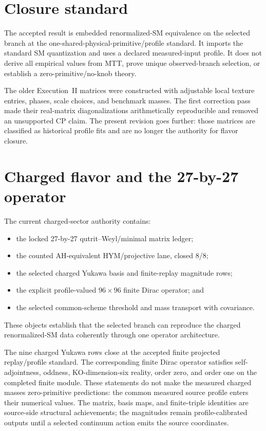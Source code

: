 \documentclass[11pt]{article}
\begin{document}
\section{Closure standard}

The accepted result is embedded renormalized-SM equivalence on the selected
branch at the one-shared-physical-primitive/profile standard. It imports the
standard SM quantization and uses a declared measured-input profile. It does
not derive all empirical values from MTT, prove unique observed-branch
selection, or establish a zero-primitive/no-knob theory.

The older Execution~II matrices were constructed with adjustable local texture
entries, phases, scale choices, and benchmark masses. The first correction pass
made their real-matrix diagonalizations arithmetically reproducible and removed
an unsupported CP claim. The present revision goes further: those matrices are
classified as historical profile fits and are no longer the authority for
flavor closure.

\section{Charged flavor and the 27-by-27 operator}

The current charged-sector authority contains:
\begin{itemize}
\item the locked 27-by-27 qutrit--Weyl/minimal matrix ledger;
\item the counted AH-equivalent HYM/projective lane, closed 8/8;
\item the selected charged Yukawa basis and finite-replay magnitude rows;
\item the explicit profile-valued $96\times96$ finite Dirac operator; and
\item the selected common-scheme threshold and mass transport with covariance.
\end{itemize}
These objects establish that the selected branch can reproduce the charged
renormalized-SM data coherently through one operator architecture.

The nine charged Yukawa rows close at the accepted finite projected
replay/profile standard. The corresponding finite Dirac operator satisfies
self-adjointness, oddness, KO-dimension-six reality, order zero, and order one
on the completed finite module. These statements do not make the measured
charged masses zero-primitive predictions: the common measured source profile
enters their numerical values. The matrix, basis maps, and finite-triple
identities are source-side structural achievements; the magnitudes remain
profile-calibrated outputs until a selected continuum action emits the source
coordinates.
\end{document}
